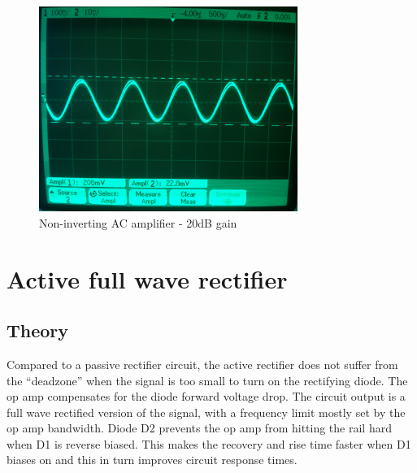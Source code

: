 \documentclass[11pt,a4paper]{article}
\begin{document}
\begin{figure}[htbp]
    \centering
    \includegraphics[width=0.75\textwidth]{img/noninvACamp-x10.jpg}
    \caption{Non-inverting AC amplifier - 20dB gain}
    \label{fig:noninvACamp-x10_scope}
\end{figure}



\section{Active full wave rectifier}\label{active-full-wave-rectifier}

\subsection{Theory}\label{fwr-theory}
Compared to a passive rectifier circuit, the active rectifier does not suffer
from the ``deadzone'' when the signal is too small to turn on the rectifying
diode. The op amp compensates for the diode forward voltage drop.  The circuit
output is a full wave rectified version of the signal, with a frequency limit
mostly set by the op amp bandwidth. Diode D2 prevents the op amp from hitting
the rail hard when D1 is reverse biased. This makes the recovery and rise time
faster when D1 biases on and this in turn improves circuit response times.
\end{document}

